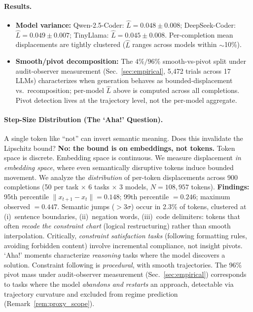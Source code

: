 \documentclass{article}
\theoremstyle{plain}
\theoremstyle{definition}
\theoremstyle{remark}
\newcommand{\secref}[1]{Sec.~\ref{#1}}
\begin{document}
\paragraph{Results.}
\begin{itemize}[nosep]
\item \textbf{Model variance:} Qwen-2.5-Coder: $\hat{L} = 0.048 \pm 0.008$; DeepSeek-Coder: $\hat{L} = 0.049 \pm 0.007$; TinyLlama: $\hat{L} = 0.045 \pm 0.008$. Per-completion mean displacements are tightly clustered ($\hat{L}$ ranges across models within $\sim$10\%).
\item \textbf{Smooth/pivot decomposition:} The $4\%/96\%$ smooth-vs-pivot split under audit-observer measurement (\secref{sec:empirical}, 5{,}472 trials across 17 LLMs) characterizes when generation behaves as bounded-displacement vs.\ recomposition; per-model $\hat{L}$ above is computed across all completions. Pivot detection lives at the trajectory level, not the per-model aggregate.
\end{itemize}

\paragraph{Step-Size Distribution (The `Aha!' Question).}
A single token like ``not'' can invert semantic meaning. Does this invalidate the Lipschitz bound? \textbf{No: the bound is on embeddings, not tokens.} Token space is discrete. Embedding space is continuous. We measure displacement \emph{in embedding space}, where even semantically disruptive tokens induce bounded movement. We analyze the \emph{distribution} of per-token displacements across 900 completions (50 per task $\times$ 6 tasks $\times$ 3 models, $N{=}108{,}957$ tokens).
\textbf{Findings:} 95th percentile $\|x_{t+1} - x_t\| = 0.148$; 99th percentile $= 0.246$; maximum observed $= 0.447$. Semantic jumps ($>3\sigma$) occur in 2.3\% of tokens, clustered at (i)~sentence boundaries, (ii)~negation words, (iii)~code delimiters: tokens that often \emph{recode the constraint chart} (logical restructuring) rather than smooth interpolation. Critically, \emph{constraint satisfaction tasks} (following formatting rules, avoiding forbidden content) involve incremental compliance, not insight pivots. `Aha!' moments characterize \emph{reasoning} tasks where the model discovers a solution. Constraint following is \emph{procedural}, with smooth trajectories. The 96\% pivot mass under audit-observer measurement (\secref{sec:empirical}) corresponds to tasks where the model \emph{abandons and restarts} an approach, detectable via trajectory curvature and excluded from regime prediction (Remark~\ref{rem:proxy_scope}).
\end{document}

